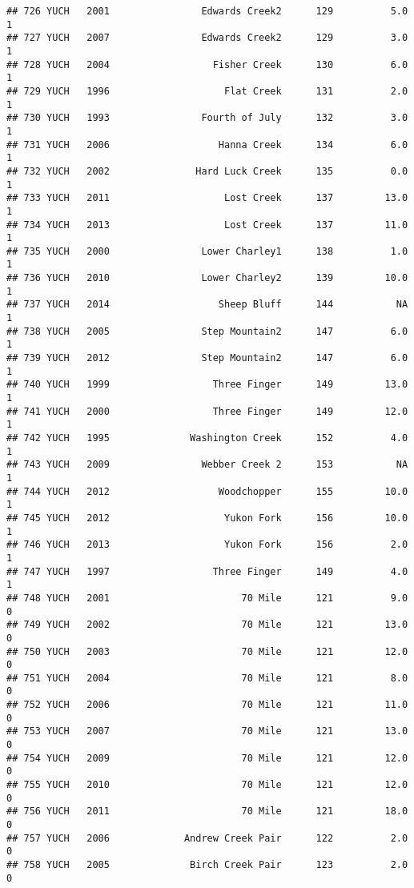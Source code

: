\documentclass[
]{article}
\begin{document}
\begin{verbatim}
## 726 YUCH   2001                Edwards Creek2      129          5.0       1
## 727 YUCH   2007                Edwards Creek2      129          3.0       1
## 728 YUCH   2004                  Fisher Creek      130          6.0       1
## 729 YUCH   1996                    Flat Creek      131          2.0       1
## 730 YUCH   1993                Fourth of July      132          3.0       1
## 731 YUCH   2006                   Hanna Creek      134          6.0       1
## 732 YUCH   2002               Hard Luck Creek      135          0.0       1
## 733 YUCH   2011                    Lost Creek      137         13.0       1
## 734 YUCH   2013                    Lost Creek      137         11.0       1
## 735 YUCH   2000                Lower Charley1      138          1.0       1
## 736 YUCH   2010                Lower Charley2      139         10.0       1
## 737 YUCH   2014                   Sheep Bluff      144           NA       1
## 738 YUCH   2005                Step Mountain2      147          6.0       1
## 739 YUCH   2012                Step Mountain2      147          6.0       1
## 740 YUCH   1999                  Three Finger      149         13.0       1
## 741 YUCH   2000                  Three Finger      149         12.0       1
## 742 YUCH   1995              Washington Creek      152          4.0       1
## 743 YUCH   2009                Webber Creek 2      153           NA       1
## 744 YUCH   2012                   Woodchopper      155         10.0       1
## 745 YUCH   2012                    Yukon Fork      156         10.0       1
## 746 YUCH   2013                    Yukon Fork      156          2.0       1
## 747 YUCH   1997                  Three Finger      149          4.0       1
## 748 YUCH   2001                       70 Mile      121          9.0       0
## 749 YUCH   2002                       70 Mile      121         13.0       0
## 750 YUCH   2003                       70 Mile      121         12.0       0
## 751 YUCH   2004                       70 Mile      121          8.0       0
## 752 YUCH   2006                       70 Mile      121         11.0       0
## 753 YUCH   2007                       70 Mile      121         13.0       0
## 754 YUCH   2009                       70 Mile      121         12.0       0
## 755 YUCH   2010                       70 Mile      121         12.0       0
## 756 YUCH   2011                       70 Mile      121         18.0       0
## 757 YUCH   2006             Andrew Creek Pair      122          2.0       0
## 758 YUCH   2005              Birch Creek Pair      123          2.0       0

\end{verbatim}
\end{document}
